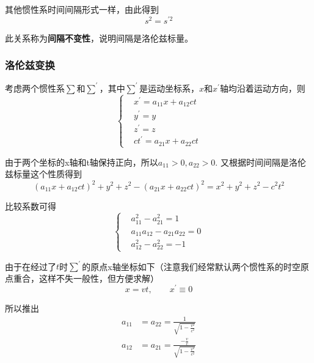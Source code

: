 \documentclass[UTF8]{ctexart}
\begin{document}
\noindent 其他惯性系时间间隔形式一样，由此得到
\begin{equation}
    s^2 = s^{\prime2}
\end{equation}

\noindent 此关系称为\textbf{间隔不变性}，说明间隔是洛伦兹标量。

    \subsubsection{洛伦兹变换}
    考虑两个惯性系$\sum$和$\sum^{\prime}$，其中$\sum^{\prime}$是运动坐标系，$x$和$x^{\prime}$轴均沿着运动方向，则
    \begin{equation}
        \left \{ \begin{aligned}
            &x^{\prime} = a_{11} x + a_{12} ct \\
            &y^{\prime} = y \\
            &z^{\prime} = z \\
            &ct^{\prime} = a_{21} x + a_{22} ct
        \end{aligned} \right.
    \end{equation}

\noindent 由于两个坐标的x轴和t轴保持正向，所以$a_{11}>0,a_{22}>0$. 又根据时间间隔是洛伦兹标量这个性质得到
\begin{equation}
    (a_{11} x + a_{12} ct)^2 + y^2 + z^2 - (a_{21} x + a_{22} ct)^2 = x^2 +y^2 +z^2 - c^2 t^2 
\end{equation}

\noindent 比较系数可得
\begin{equation}
    \left \{ \begin{aligned}
        &a_{11}^2 - a_{21}^2 = 1 \\
        &a_{11}a_{12}-a_{21}a_{22} = 0 \\
        &a_{12}^2-a_{22}^2 = -1
    \end{aligned} \right.
\end{equation}

    由于在经过了$t$时$\sum^{\prime}$的原点x轴坐标如下（注意我们经常默认两个惯性系的时空原点重合，这样不失一般性，但方便求解）
    \begin{equation}
        x = vt, \qquad x^{\prime} \equiv 0
    \end{equation}

\noindent 所以推出 
\begin{equation}
    \begin{aligned}
        a_{11} &= a_{22} = \frac{1}{\sqrt{1-\frac{v^2}{c^2}}} \\ 
        a_{12} &= a_{21} = \frac{-\frac{v}{c}}{\sqrt{1-\frac{v^2}{c^2}}}
    \end{aligned}
\end{equation}
\end{document}
